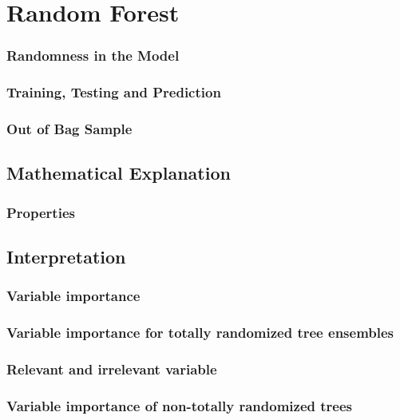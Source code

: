 \pagebreak
\section{Random Forest}


\subsubsection{Randomness in the Model}


\subsubsection {Training, Testing and Prediction}


\subsubsection {Out of Bag Sample}

\subsection{Mathematical Explanation}



\subsubsection{Properties}



\subsection{Interpretation}

\subsubsection{Variable importance}

\subsubsection{Variable importance for totally randomized tree ensembles}


\subsubsection{Relevant and irrelevant variable}

\subsubsection{Variable importance of non-totally randomized trees}
